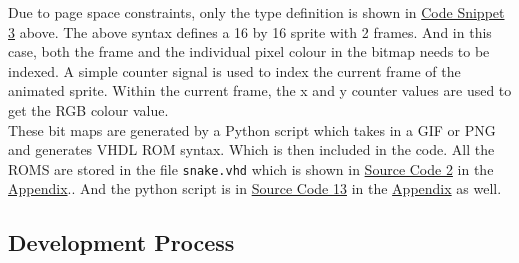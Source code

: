 \documentclass[aps, secnumarabic, balancelastpage, asmath, amssymb, nofootinbib, floatfix,]{revtex4-2}
\begin{document}
{Due to page space constraints, only the type definition is shown in \hyperref[code:3]{Code Snippet 3} above. The above syntax defines a 16 by 16 sprite with 2 frames. And in this case, both the frame and the individual pixel colour in the bitmap needs to be indexed. A simple counter signal is used to index the current frame of the animated sprite. Within the current frame, the x and y counter values are used to get the RGB colour value.\\
These bit maps are generated by a Python script which takes in a GIF or PNG and generates VHDL ROM syntax. Which is then included in the code. All the ROMS are stored in the file \verb|snake.vhd| which is shown in \hyperref[code:snake]{Source Code 2} in the \hyperref[sec:app]{Appendix}.. And the python script is in \hyperref[code:py]{Source Code 13} in the \hyperref[sec:app]{Appendix} as well.

\vspace{-0.7em}
\subsection{\fontsize{11.4pt}{12pt}\selectfont \bf Development Process \label{sec:2.3}}

}
\end{document}
